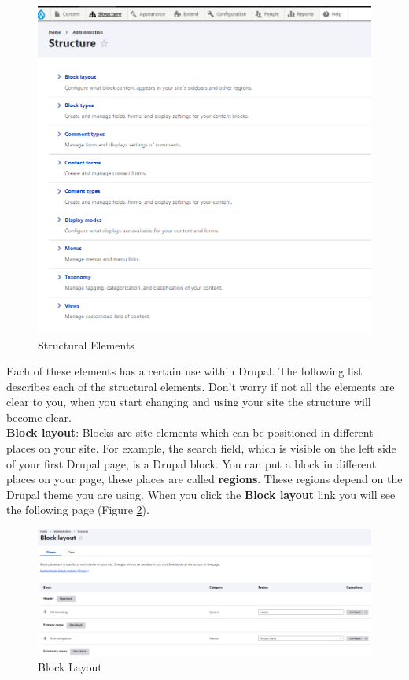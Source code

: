 \begin{figure}[H]
    \centering
    \includegraphics[width=1\linewidth]{img/ch4/admin_structure}
    \caption{Structural Elements}
    \label{fig:struct_elements}
\end{figure}

Each of these elements has a certain use within Drupal. The following list describes each of the structural elements. Don’t worry if not all the elements are clear to you, when you start changing and using your site the structure will become clear.
\\

\textbf{Block layout}: Blocks are site elements which can be positioned in different places on your site. For example, the search field, which is visible on the left side of your first Drupal page, is a Drupal block. You can put a block in different places on your page, these places are called \textbf{regions}. These regions depend on the Drupal theme you are using. When you click the \textbf{Block layout} link you will see the following page (Figure \ref{fig:admin_block_layout}).

\begin{figure}[H]
    \centering
    \includegraphics[width=1\linewidth]{img/ch4/admin_block_layout}
    \caption{Block Layout}
    \label{fig:admin_block_layout}
\end{figure}

